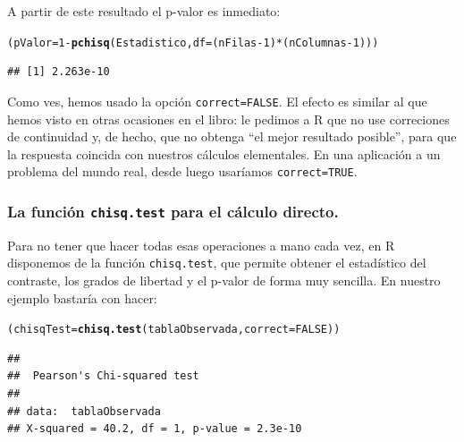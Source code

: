 \documentclass[10pt,a4paper]{article}\usepackage[]{graphicx}\usepackage[]{color}
\makeatletter
\newcommand{\hlnum}[1]{\textcolor[rgb]{0.686,0.059,0.569}{#1}}%
\newcommand{\hlopt}[1]{\textcolor[rgb]{0,0,0}{#1}}%
\newcommand{\hlstd}[1]{\textcolor[rgb]{0.345,0.345,0.345}{#1}}%
\newcommand{\hlkwb}[1]{\textcolor[rgb]{0.69,0.353,0.396}{#1}}%
\newcommand{\hlkwc}[1]{\textcolor[rgb]{0.333,0.667,0.333}{#1}}%
\newcommand{\hlkwd}[1]{\textcolor[rgb]{0.737,0.353,0.396}{\textbf{#1}}}%
\newenvironment{kframe}{%
 \def\at@end@of@kframe{}%
 \ifinner\ifhmode%
  \def\at@end@of@kframe{\end{minipage}}%
  \begin{minipage}{\columnwidth}%
 \fi\fi%
 \def\FrameCommand##1{\hskip\@totalleftmargin \hskip-\fboxsep
 \colorbox{shadecolor}{##1}\hskip-\fboxsep
     \hskip-\linewidth \hskip-\@totalleftmargin \hskip\columnwidth}%
 \MakeFramed {\advance\hsize-\width
   \@totalleftmargin\z@ \linewidth\hsize
   \@setminipage}}%
 {\par\unskip\endMakeFramed%
 \at@end@of@kframe}
\newenvironment{knitrout}{}{} %
\newcounter {cont01}
\makeatother
\begin{document}
A partir de este resultado el p-valor es inmediato:

\begin{knitrout}
\color{fgcolor}\begin{kframe}
\begin{alltt}
\hlstd{(pValor} \hlkwb{=} \hlnum{1} \hlopt{-} \hlkwd{pchisq}\hlstd{(Estadistico,} \hlkwc{df}\hlstd{=(nFilas} \hlopt{-} \hlnum{1}\hlstd{)} \hlopt{*} \hlstd{(nColumnas} \hlopt{-} \hlnum{1}\hlstd{)))}
\end{alltt}
\begin{verbatim}
## [1] 2.263e-10
\end{verbatim}
\end{kframe}
\end{knitrout}

Como ves, hemos usado la opción {\tt correct=FALSE}. El efecto es similar al que hemos visto en otras ocasiones en el libro: le pedimos a R que no use correciones de continuidad y, de hecho, que no obtenga ``el mejor resultado posible'', para que la respuesta coincida con nuestros cálculos elementales. En una aplicación a un problema del mundo real, desde luego usaríamos {\tt correct=TRUE}.

\subsubsection*{La función {\tt chisq.test} para el cálculo directo.}
\label{tut12:subsubsec:FuncionChisqTestIndependenci.}

Para no tener que hacer todas esas operaciones a mano cada vez, en R disponemos de la función {\tt chisq.test}, que permite obtener el estadístico del contraste, los grados de libertad y el p-valor de forma muy sencilla. En nuestro ejemplo bastaría con hacer:

\begin{knitrout}
\color{fgcolor}\begin{kframe}
\begin{alltt}
\hlstd{(chisqTest} \hlkwb{=} \hlkwd{chisq.test}\hlstd{(tablaObservada,} \hlkwc{correct}\hlstd{=}\hlnum{FALSE}\hlstd{))}
\end{alltt}
\begin{verbatim}
## 
## 	Pearson's Chi-squared test
## 
## data:  tablaObservada
## X-squared = 40.2, df = 1, p-value = 2.3e-10
\end{verbatim}
\end{kframe}
\end{knitrout}
\end{document}
